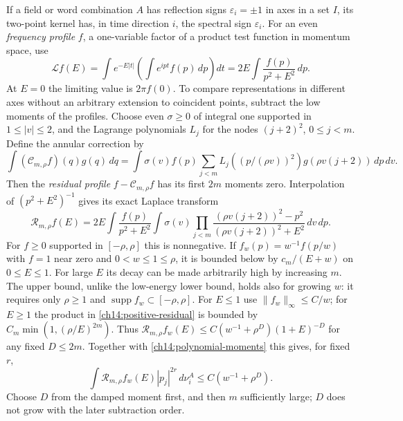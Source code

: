 If a field or word combination $A$ has reflection signs
$\varepsilon_i=\pm1$ in axes in a set $I$, its two-point kernel
has, in time direction $i$, the spectral sign $\varepsilon_i$.
For an even \emph{frequency profile} $f$, a one-variable factor of a product test function in momentum space, use
\[
 \mathcal Lf(E)=\int e^{-E|t|}\left(\int e^{ipt}f(p)\,dp\right)dt
       =2E\int\frac{f(p)}{p^2+E^2}\,dp.
\]
At $E=0$ the limiting value is $2\pi f(0)$.
To compare representations in different axes without an arbitrary
extension to coincident points, subtract the low moments of the profiles.
Choose even $\sigma\ge0$ of integral one supported in
$1\le|v|\le2$, and the Lagrange polynomials $L_j$ for the nodes
$(j+2)^2$, $0\le j<m$. Define the annular correction by
\[
 \int (\mathcal C_{m,\rho}f)(q)g(q)\,dq
 =\int\sigma(v)f(p)\sum_{j<m}L_j((p/(\rho v))^2)
                           g(\rho v(j+2))\,dp\,dv.
\]
Then the \emph{residual profile} $f-\mathcal C_{m,\rho}f$ has its first $2m$ moments zero.
Interpolation of $(p^2+E^2)^{-1}$ gives its exact Laplace transform
\begin{equation}\label{ch14:positive-residual}
 \mathcal R_{m,\rho}f(E)
 =2E\int\frac{f(p)}{p^2+E^2}\int\sigma(v)
       \prod_{j<m}\frac{(\rho v(j+2))^2-p^2}
                          {(\rho v(j+2))^2+E^2}\,dv\,dp.
\end{equation}
For $f\ge0$ supported in $[-\rho,\rho]$ this is nonnegative.
If $f_w(p)=w^{-1}f(p/w)$ with $f=1$ near zero and
$0<w\le1\le\rho$, it is bounded below by
$c_m/(E+w)$ on $0\le E\le1$. For large $E$ its decay can be made
arbitrarily high by increasing $m$. The upper bound, unlike the
low-energy lower bound, holds also for growing $w$: it requires only
$\rho\ge1$ and $\operatorname{supp}f_w\subset[-\rho,\rho]$.
For $E\le1$ use $\|f_w\|_\infty\le C/w$; for $E\ge1$ the
product in \eqref{ch14:positive-residual} is bounded by
$C_m\min(1,(\rho/E)^{2m})$. Thus
$\mathcal R_{m,\rho}f_w(E)\le C(w^{-1}+\rho^D)(1+E)^{-D}$
for any fixed $D\le2m$. Together with
\eqref{ch14:polynomial-moments} this gives, for fixed $r$,
\[
 \int\mathcal R_{m,\rho}f_w(E)|p_j|^{2r}\,d\nu_i^A
                                      \le C(w^{-1}+\rho^D).
\]
Choose $D$ from the damped moment first, and then $m$ sufficiently
large; $D$ does not grow with the later subtraction order.

